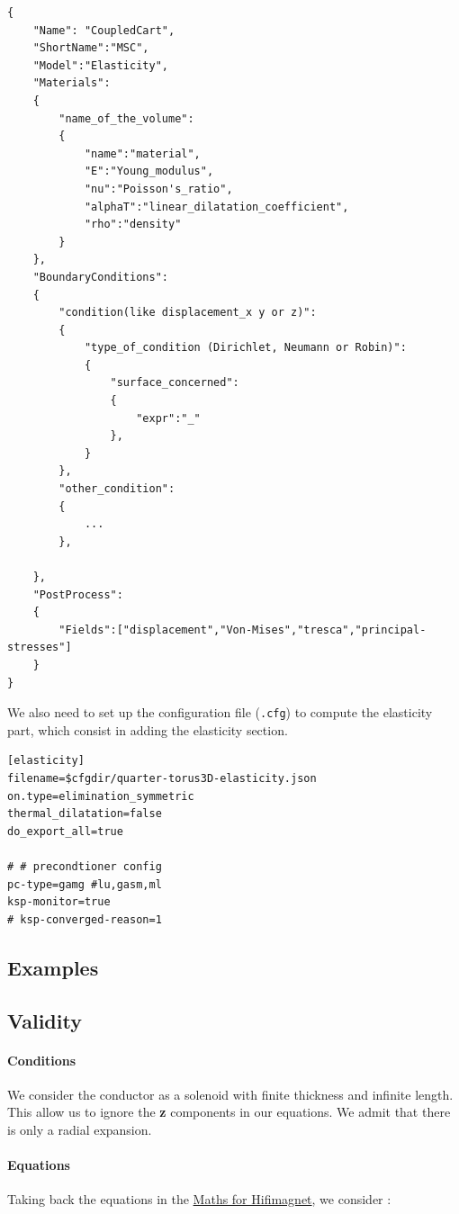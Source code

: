 \documentclass[11pt]{amsart}
\begin{document}
\begin{verbatim}
{
    "Name": "CoupledCart",
    "ShortName":"MSC",
    "Model":"Elasticity",
    "Materials":
    {
        "name_of_the_volume":
        {
            "name":"material",
            "E":"Young_modulus",
            "nu":"Poisson's_ratio",
            "alphaT":"linear_dilatation_coefficient",
            "rho":"density"
        }
    },
    "BoundaryConditions":
    {
        "condition(like displacement_x y or z)":
        {
            "type_of_condition (Dirichlet, Neumann or Robin)":
            {
                "surface_concerned":
                {
                    "expr":"_"
                },
            }
        },
        "other_condition":
        {
            ...
        },

    },
    "PostProcess":
    {
        "Fields":["displacement","Von-Mises","tresca","principal-stresses"]
    }
}
\end{verbatim}

We also need to set up the configuration file (\texttt{.cfg}) to compute the elasticity part, which consist in adding the elasticity section.


\begin{verbatim}
[elasticity]
filename=$cfgdir/quarter-torus3D-elasticity.json
on.type=elimination_symmetric
thermal_dilatation=false
do_export_all=true

# # precondtioner config
pc-type=gamg #lu,gasm,ml
ksp-monitor=true
# ksp-converged-reason=1
\end{verbatim}

\hypertarget{x-examples}{\subsection{Examples}}

\hypertarget{x-validity}{\subsection{Validity}}
\hypertarget{x-conditions}{\paragraph{Conditions}}
We consider the conductor as a solenoid with finite thickness and infinite length. This allow us to ignore the \textbf{z} components in our equations.
We admit that there is only a radial expansion.


\hypertarget{x-equations}{\paragraph{Equations}}
Taking back the equations in the \href{/math.adoc}{Maths for Hifimagnet}, we consider :
\end{document}
